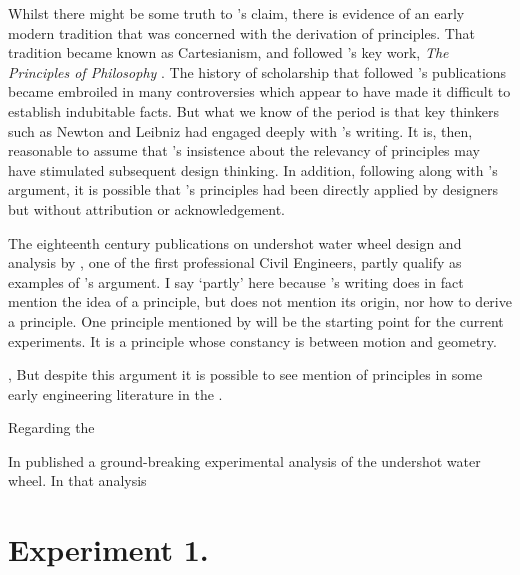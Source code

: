\documentclass[a4paper, 12pt]{article}
\begin{document}
Whilst there might be some truth to \citeauthor{ewbank_descriptive_1857}'s claim, there is evidence of an early modern tradition that was concerned with the derivation of principles. That tradition became known as Cartesianism, and followed \citeauthor{descartes_principles_1982}'s key work, \textit{The Principles of Philosophy} \citep{descartes_principles_1982}. The history of scholarship that followed \citeauthor{descartes_principles_1982}'s publications became embroiled in many controversies which appear to have made it difficult to establish indubitable facts. But what we know of the period is that key thinkers such as Newton and Leibniz had engaged deeply with \citeauthor{descartes_principles_1982}'s writing. It is, then, reasonable to assume that \citeauthor{descartes_principles_1982}'s insistence about the relevancy of principles may have stimulated subsequent design thinking. In addition, following along with \citeauthor{ewbank_descriptive_1857}'s argument, it is possible that \citeauthor{descartes_principles_1982}'s principles had been directly applied by designers but without attribution or acknowledgement.

The eighteenth century publications on undershot water wheel design and analysis by \citeauthor{smeaton_experimental_1759}, one of the first professional Civil Engineers, partly qualify as examples of \citeauthor{ewbank_descriptive_1857}'s argument. I say `partly' here because \citeauthor{smeaton_experimental_1759}'s writing does in fact mention the idea of a principle, but does not mention its origin, nor how to derive a principle. One principle mentioned by \citeauthor{smeaton_experimental_1759} will be the starting point for the current experiments. It is a principle whose constancy is between motion and geometry.




, But despite this argument it is possible to see mention of principles in some early engineering literature in the .




Regarding the


In \citeyear{smeaton_experimental_1759} \citeauthor{smeaton_experimental_1759} published a ground-breaking experimental analysis of the undershot water wheel. In that analysis \citeyear{smeaton_experimental_1759}


\section{Experiment 1.}
\end{document}
